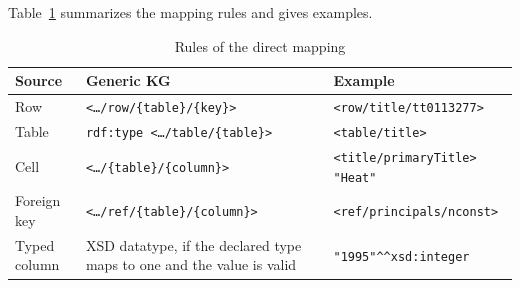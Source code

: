Table~\ref{tab:mapping-rules} summarizes the mapping rules and gives examples.  
\begin{table}[!htbp]
  \centering
  \small
  \renewcommand{\arraystretch}{1.4}
  \begin{tabular}{p{2.6cm} p{6.1cm} p{4.6cm}}
    \hline
    \textbf{Source} & \textbf{Generic KG} & \textbf{Example} \\
    \hline
    Row & \texttt{<…/row/\{table\}/\{key\}>} & \texttt{<row/title/tt0113277>} \\
    Table & \texttt{rdf:type <…/table/\{table\}>} & \texttt{<table/title>} \\
    Cell & \texttt{<…/\{table\}/\{column\}>} & \texttt{<title/primaryTitle> "Heat"} \\
    Foreign key & \texttt{<…/ref/\{table\}/\{column\}>} & \texttt{<ref/principals/nconst>} \\
    Typed column & XSD datatype, if the declared type maps to one and the value is valid & \texttt{"1995"\^{}\^{}xsd:integer} \\
    \hline
  \end{tabular}
  \caption{Rules of the direct mapping}
  \label{tab:mapping-rules}
\end{table}



